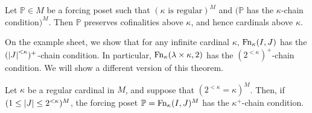 \begin{theorem}
    Let \( \mathbb P \in M \) be a forcing poset such that \( (\kappa \text{ is regular})^M \) and \( (\mathbb P \) has the \( \kappa \)-chain condition\( )^M \).
    Then \( \mathbb P \) preserves cofinalities above \( \kappa \), and hence cardinals above \( \kappa \).
\end{theorem}
On the example sheet, we show that for any infinite cardinal \( \kappa \), \( \operatorname{Fn}_\kappa(I, J) \) has the \( (\abs{J}^{<\kappa})^+ \)-chain condition.
In particular, \( \operatorname{Fn}_\kappa(\lambda \times \kappa, 2) \) has the \( (2^{<\kappa})^+ \)-chain condition.
We will show a different version of this theorem.
\begin{lemma}
    Let \( \kappa \) be a regular cardinal in \( M \), and suppose that \( (2^{<\kappa} = \kappa)^M \).
    Then, if \( (1 \leq \abs{J} \leq 2^{<\kappa})^M \), the forcing poset \( \mathbb P = \operatorname{Fn}_\kappa(I, J)^M \) has the \( \kappa^+ \)-chain condition.
\end{lemma}
